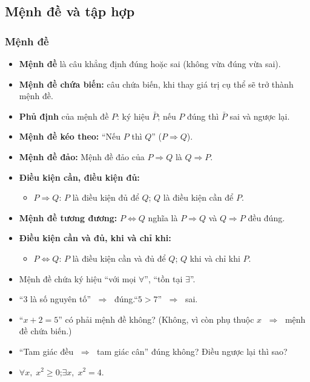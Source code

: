 \documentclass[12pt,a4paper]{article}
\begin{document}
\subsection{Mệnh đề và tập hợp}

\subsubsection{Mệnh đề}

\begin{dinhnghia}
  \begin{itemize}
    \item \textbf{Mệnh đề} là câu khẳng định đúng hoặc sai (không vừa đúng vừa sai).
    \item \textbf{Mệnh đề chứa biến:} câu chứa biến, khi thay giá trị cụ thể sẽ trở thành mệnh đề.
    \item \textbf{Phủ định} của mệnh đề $P$: ký hiệu $\bar{P}$; nếu $P$ đúng thì $\bar{P}$ sai và ngược lại.
    \item \textbf{Mệnh đề kéo theo:} ``Nếu $P$ thì $Q$'' ($P \Rightarrow Q$).
    \item \textbf{Mệnh đề đảo:} Mệnh đề đảo của $P \Rightarrow Q$ là $Q \Rightarrow P$.
    \item \textbf{Điều kiện cần, điều kiện đủ:}
      \begin{itemize}
        \item $P \Rightarrow Q$: $P$ là điều kiện đủ để $Q$;\; $Q$ là điều kiện cần để $P$.
      \end{itemize}
    \item \textbf{Mệnh đề tương đương:} $P \Leftrightarrow Q$ nghĩa là $P \Rightarrow Q$ và $Q \Rightarrow P$ đều đúng.
    \item \textbf{Điều kiện cần và đủ, khi và chỉ khi:}
      \begin{itemize}
        \item $P \Leftrightarrow Q$: $P$ là điều kiện cần và đủ để $Q$;\; $Q$ khi và chỉ khi $P$.
      \end{itemize}
    \item Mệnh đề chứa ký hiệu ``với mọi $\forall$'', ``tồn tại $\exists$''.
  \end{itemize}
\end{dinhnghia}

\begin{vidu}
  \begin{itemize}
    \item ``3 là số nguyên tố'' $\;\Rightarrow\;$ đúng.\quad ``$5 > 7$'' $\;\Rightarrow\;$ sai.
    \item ``$x + 2 = 5$'' có phải mệnh đề không? (Không, vì còn phụ thuộc $x$ $\;\Rightarrow\;$ mệnh đề chứa biến.)
    \item ``Tam giác đều $\;\Rightarrow\;$ tam giác cân'' đúng không? Điều ngược lại thì sao?
    \item $\forall x,\; x^2 \ge 0$;\quad $\exists x,\; x^2 = 4$.
  \end{itemize}
\end{vidu}
\end{document}
